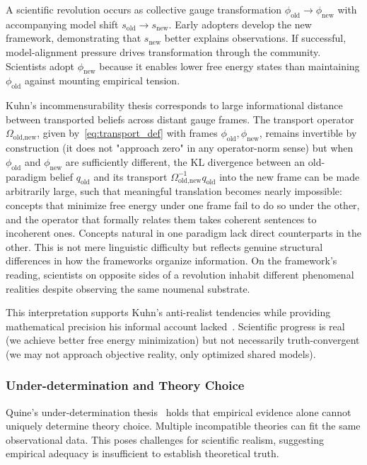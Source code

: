 \documentclass[11pt]{article}
\begin{document}
A scientific revolution occurs as collective gauge transformation $\phi_{\text{old}} \to \phi_{\text{new}}$ with accompanying model shift $s_{\text{old}} \to s_{\text{new}}$. Early adopters develop the new framework, demonstrating that $s_{\text{new}}$ better explains observations. If successful, model-alignment pressure drives transformation through the community. Scientists adopt $\phi_{\text{new}}$ because it enables lower free energy states than maintaining $\phi_{\text{old}}$ against mounting empirical tension.

Kuhn's incommensurability thesis corresponds to large informational distance between transported beliefs across distant gauge frames. The transport operator $\Omega_{\text{old,new}}$, given by~\eqref{eq:transport_def} with frames $\phi_{\text{old}}, \phi_{\text{new}}$, remains invertible by construction (it does not "approach zero" in any operator-norm sense) but when $\phi_{\text{old}}$ and $\phi_{\text{new}}$ are sufficiently different, the KL divergence between an old-paradigm belief $q_{\text{old}}$ and its transport $\Omega_{\text{old,new}}^{-1} q_{\text{old}}$ into the new frame can be made arbitrarily large, such that meaningful translation becomes nearly impossible: concepts that minimize free energy under one frame fail to do so under the other, and the operator that formally relates them takes coherent sentences to incoherent ones. Concepts natural in one paradigm lack direct counterparts in the other. This is not mere linguistic difficulty but reflects genuine structural differences in how the frameworks organize information. On the framework's reading, scientists on opposite sides of a revolution inhabit different phenomenal realities despite observing the same noumenal substrate.

This interpretation supports Kuhn's anti-realist tendencies while providing mathematical precision his informal account lacked~\cite{Hoyningen-Huene1993}. Scientific progress is real (we achieve better free energy minimization) but not necessarily truth-convergent (we may not approach objective reality, only optimized shared models).

\subsubsection{Under-determination and Theory Choice}

Quine's under-determination thesis~\cite{Quine1951, Quine1975} holds that empirical evidence alone cannot uniquely determine theory choice.  Multiple incompatible theories can fit the same observational data. This poses challenges for scientific realism, suggesting empirical adequacy is insufficient to establish theoretical truth.
\end{document}
